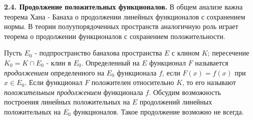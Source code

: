 \documentclass[a4paper, 12pt,fleqn]{article}
\begin{document}
  \textbf{2.4. Продолжение положительных функционалов.} В общем анализе важна теорема Хана -
  Банаха о продолжении линейных функционалов с сохранением нормы. В теории
  полуупорядоченных пространств аналогичную роль играет теорема о продолжении
  функционалов с сохранением положительности.
  
  Пусть $E_0$ - подпространство банахова пространства $E$ с клином $K$; пересечение
  $K_0=K\cap  E_0$ - клин в $E_0$. Определенный на $E$ функционал $F$ называется \textit{продолжением}
  определенного на $E_0$ функционала $f$, если $F(x)=f(x)$ при $x\in E_0$. Если функционал $F$
  положителен относительно $K$, то его называют \textit{положительным продолжением} функционала $f$.
  Обсудим возможность построения линейных положительных на $E$ продолжений линейных
  положительных на $E_0$ функционалов. Такое продолжение возможно не всегда.
  
  
\end{document}
